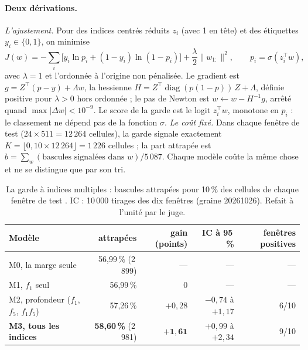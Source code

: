 \paragraph{Deux dérivations.} \emph{L'ajustement.} Pour des indices centrés réduits $z_i$ (avec 1 en tête) et des étiquettes $y_i \in \{0, 1\}$, on minimise
\begin{equation}\label{t3tro:eq:logistique}
J(w) = -\sum_i \bigl[y_i \ln p_i + (1 - y_i)\ln(1 - p_i)\bigr] + \frac{\lambda}{2}\lVert w_{1:}\rVert^2, \qquad p_i = \sigma(z_i^\top w),
\end{equation}
avec $\lambda = 1$ et l'ordonnée à l'origine non pénalisée. Le gradient est $g = Z^\top(p - y) + \Lambda w$, la hessienne $H = Z^\top \operatorname{diag}(p(1-p))\,Z + \Lambda$, définie positive pour $\lambda > 0$ hors ordonnée ; le pas de Newton est $w \leftarrow w - H^{-1}g$, arrêté quand $\max|\Delta w| < 10^{-9}$. Le score de la garde est le logit $z_i^\top w$, monotone en $p_i$ : le classement ne dépend pas de la fonction $\sigma$. \emph{Le coût fixé.} Dans chaque fenêtre de test ($24 \times 511 = 12\,264$ cellules), la garde signale exactement $K = \lfloor 0{,}10 \times 12\,264\rfloor = 1\,226$ cellules ; la part attrapée est $b = \sum_w (\text{bascules signalées dans } w)/5\,087$. Chaque modèle coûte la même chose et ne se distingue que par son tri.

\begin{table}[tbp]
\centering\small
\caption[La garde à indices multiples]{La garde à indices multiples : bascules attrapées pour 10\,\% des cellules de chaque fenêtre de test \mes. IC : 10\,000 tirages des dix fenêtres (graine 20261026). Refait à l'unité par le juge.}
\label{t3tro:tab:indices}
\begin{tabular}{@{}lrrrr@{}}
\toprule
Modèle & attrapées & gain (points) & IC à 95\,\% & fenêtres positives \\
\midrule
M0, la marge seule & 56,99\,\% (2\,899) & --- & --- & --- \\
M1, $f_1$ seul & 56,99\,\% & 0 & --- & --- \\
M2, profondeur ($f_1$, $f_5$, $f_1 f_5$) & 57,26\,\% & $+0{,}28$ & $-0{,}74$ à $+1{,}17$ & 6/10 \\
\textbf{M3, tous les indices} & \textbf{58,60\,\%} (2\,981) & $\mathbf{+1{,}61}$ & $+0{,}99$ à $+2{,}34$ & 9/10 \\
\bottomrule
\end{tabular}
\end{table}

